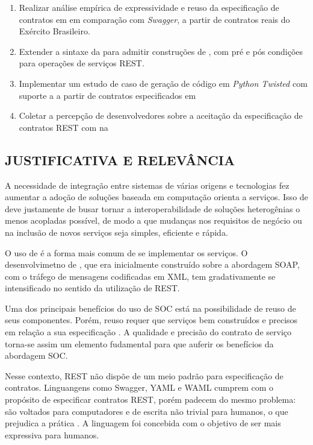 \begin{enumerate}
  \item Realizar análise empírica de expressividade e reuso da especificação de
  contratos em \neoidl em comparação com \textit{Swagger}, a partir de contratos
  reais do Exército Brasileiro.
  \item Extender a sintaxe da \neoidl para admitir construções de 
  \designbycontract, com pré e pós condições para operações de serviços REST.
  \item Implementar um estudo de caso de geração de código em \textit{Python
  Twisted} com suporte a \designbycontract a partir de contratos especificados
  em \neoidl
  \item Coletar a percepção de desenvolvedores sobre a aceitação da
  especificação de contratos REST com \designbycontract na \neoidl
\end{enumerate}


\subsection{JUSTIFICATIVA E RELEVÂNCIA}
\vspace{-6mm}

A necessidade de integração entre sistemas de várias origens e tecnologias fez
aumentar a adoção de soluções baseada em computação orienta a serviços. Isso de
deve justamente de busar tornar a interoperabilidade de soluções heterogênias
o menos acopladas possível, de modo a que mudanças nos requisitos de negócio ou
na inclusão de novos serviços seja simples, eficiente e rápida.

O uso de \ws{} é a forma mais comum de se implementar os serviços. O
desenvolvimetno de \ws{}, que era inicialmente construído sobre a abordagem
SOAP, com o tráfego de mensagens codificadas em XML, tem gradativamente se
intensificado no sentido da utilização de REST.

Uma dos principais benefícios do uso de SOC está na possibilidade de reuso de
seus componentes. Porém, reuso requer que serviços bem construídos e precisos em
relação a sua especificação \cite{jazequel1997design}. A qualidade e precisão do
contrato de serviço torna-se assim um elemento fudamental para que auferir os benefícios da
abordagem SOC.

Nesse contexto, REST não dispõe de um meio padrão para especificação de
contratos. Linguangens como Swagger, YAML e WAML cumprem com o propósito de
especificar contratos REST, porém padecem do mesmo problema: são voltados para
computadores e de escrita não trivial para humanos, o que prejudica a prática
\CtFirst{}. A linguagem \neoidl{} foi concebida com o objetivo de ser mais
expressiva para humanos.

